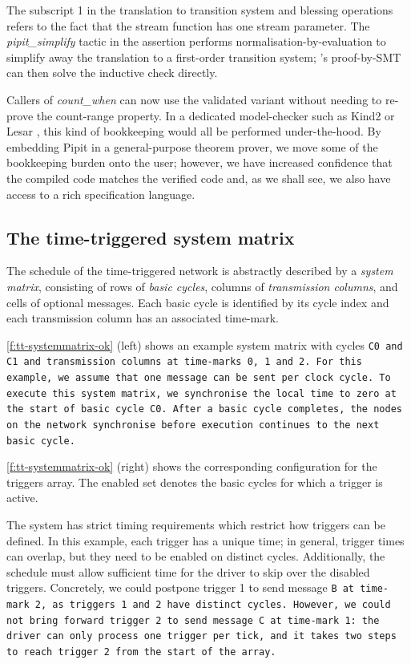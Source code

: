 \documentclass[a4paper,UKenglish,cleveref, autoref, thm-restate,anonymous]{lipics-v2021}
\begin{document}
The subscript 1 in the translation to transition system and blessing operations refers to the fact that the stream function has one stream parameter.
The \emph{pipit_simplify} tactic in the assertion performs normalisation-by-evaluation to simplify away the translation to a first-order transition system; \fstar{}'s proof-by-SMT can then solve the inductive check directly.


Callers of \emph{count_when} can now use the validated variant without needing to re-prove the count-range property.
In a dedicated model-checker such as Kind2 \cite{champion2016kind2} or Lesar \cite{raymond2008synchronous}, this kind of bookkeeping would all be performed under-the-hood.
By embedding Pipit in a general-purpose theorem prover, we move some of the bookkeeping burden onto the user; however, we have increased confidence that the compiled code matches the verified code and, as we shall see, we also have access to a rich specification language.


\subsection{The time-triggered system matrix}

The schedule of the time-triggered network is abstractly described by a \emph{system matrix}, consisting of rows of \emph{basic cycles}, columns of \emph{transmission columns}, and cells of optional messages.
Each basic cycle is identified by its cycle index and each transmission column has an associated time-mark.

\autoref{f:tt-systemmatrix-ok} (left) shows an example system matrix with cycles \tt{C0} and \tt{C1} and transmission columns at time-marks 0, 1 and 2.
For this example, we assume that one message can be sent per clock cycle. To execute this system matrix, we synchronise the local time to zero at the start of basic cycle \tt{C0}.
After a basic cycle completes, the nodes on the network synchronise before execution continues to the next basic cycle.

\autoref{f:tt-systemmatrix-ok} (right) shows the corresponding configuration for the triggers array.
The enabled set denotes the basic cycles for which a trigger is active.

The system has strict timing requirements which restrict how triggers can be defined.
In this example, each trigger has a unique time; in general, trigger times can overlap, but they need to be enabled on distinct cycles.
Additionally, the schedule must allow sufficient time for the driver to skip over the disabled triggers.
Concretely, we could postpone trigger 1 to send message \tt{B} at time-mark 2, as triggers 1 and 2 have distinct cycles.
However, we could not bring forward trigger 2 to send message \tt{C} at time-mark 1: the driver can only process one trigger per tick, and it takes two steps to reach trigger 2 from the start of the array.
\end{document}
